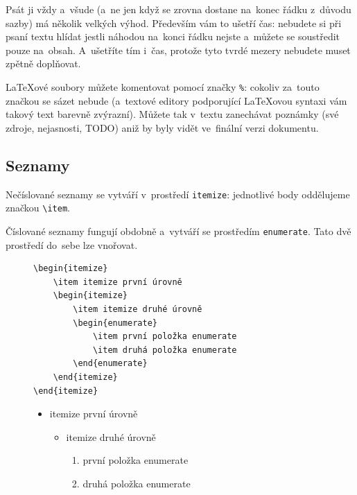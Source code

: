 Psát ji vždy a~všude (a~ne jen když se zrovna dostane na~konec řádku z~důvodu sazby) má několik velkých výhod.
Především vám to ušetří čas: nebudete si při psaní textu hlídat jestli náhodou na~konci řádku nejste a~můžete se soustředit pouze na~obsah.
A~ušetříte tím i~čas, protože tyto tvrdé mezery nebudete muset zpětně doplňovat.

\LaTeX{}ové soubory můžete komentovat pomocí značky \verb|%|: cokoliv za~touto značkou se sázet nebude (a~textové editory podporující \LaTeX{}ovou syntaxi vám takový text barevně zvýrazní).
Můžete tak v~textu zanechávat poznámky (své zdroje, nejasnosti, TODO) aniž by byly vidět ve~finální verzi dokumentu.

\subsection{Seznamy}
\label{sec:seznamy}

Nečíslované seznamy se vytváří v~prostředí \verb|itemize|:
jednotlivé body oddělujeme značkou \verb|\item|.

Číslované seznamy fungují obdobně a~vytváří se prostředím \verb|enumerate|.
Tato dvě prostředí do~sebe lze vnořovat.

\begin{figure}[ht]
\begin{mdframed}
\onehalfspacing
\begin{verbatim}
\begin{itemize}
    \item itemize první úrovně
    \begin{itemize}
        \item itemize druhé úrovně
        \begin{enumerate}
            \item první položka enumerate
            \item druhá položka enumerate
        \end{enumerate}
    \end{itemize}
\end{itemize}
\end{verbatim}

\vspace*{1em}

\begin{itemize}
    \item itemize první úrovně
    \begin{itemize}
        \item itemize druhé úrovně
        \begin{enumerate}
            \item první položka enumerate
            \item druhá položka enumerate
        \end{enumerate}
    \end{itemize}
\end{itemize}
\end{mdframed}
\end{figure}
\FloatBarrier

